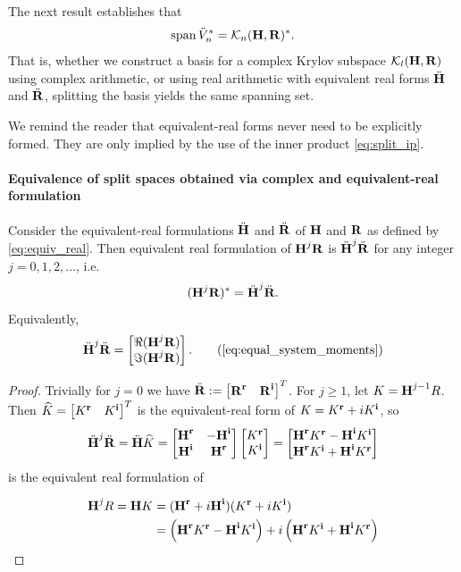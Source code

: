 The next result establishes that  
\[
\spn{\Veq_n^*} = \krylov{n}{\H}{\RR}^*.
\]
That is, whether we construct a basis for a complex Krylov subspace $\krylov{l}{\H}{\RR}$ using complex arithmetic, or using real arithmetic with equivalent real forms $\Heq$ and $\Req$, splitting the basis yields the same spanning set.  

We remind the reader that equivalent-real forms never need to be explicitly formed. They are only implied by the use of the inner product \eqref{eq:split_ip}. 

\paragraph{Equivalence of split  spaces obtained via complex and equivalent-real formulation}
\label{sec:equivbases}
\begin{lemma}\label{lem:equal_system_moments}
Consider the equivalent-real formulations $\Heq$ and $\Req$ of $\H$ and $\RR$ as defined by \eqref{eq:equiv_real}.  
Then equivalent real formulation of $\H^j \RR$ is $\Heq^j \Req$ for any integer $j=0,1,2,\ldots$, i.e.
\begin{equation}
   (\H^j \RR)^* =   \Heq^j \Req.
\label{eq:equal_system_moments}
\end{equation}
Equivalently,
\begin{equation}
\Heq^j \Req = \mat{\Re(\H^j \RR) \\ \Im(\H^j \RR)}.
\tag{\ref{eq:equal_system_moments}}
\end{equation}
\end{lemma}

\begin{proof}
Trivially for $j=0$ we have $\Req := \mat{\rp{\RR}{} & \ip{\RR}{}}^T$.
For $j\geq 1$, let $K = \H^{j-1} R$. Then $\Keq = \mat{\rp{K}{}& \ip{K}{}}^T$
is the equivalent-real form of $K = \rp{K}{} + i \ip{K}{}$, so
 \begin{equation*}
 \Heq^j \Req  = \Heq\Keq = \mat{\rp{\H}{} & -\ip{\H}{}\\ \ip{\H}{} & \rp{\H}{}} \mat{\rp{K}{} \\ \ip{K}{}}
 = \mat{\rp{\H}{} \rp{K}{} - \ip{\H}{} \ip{K}{} \\ \rp{\H}{}\ip{K}{} + \ip{\H}{}\rp{K}{} }
 \end{equation*}
is the equivalent real formulation of

\begin{align*}
\H^j R = \H K &= (\rp{\H}{} + i \ip{\H}{})(\rp{K}{} + i\ip{K}{})\\
 &= \left( \rp{\H}{}\rp{K}{} - \ip{\H}{}\ip{K}{} \right) +
	i\left(\rp{\H}{}\ip{K}{} + \ip{\H}{}\rp{K}{}  \right)
\end{align*}
\end{proof}


